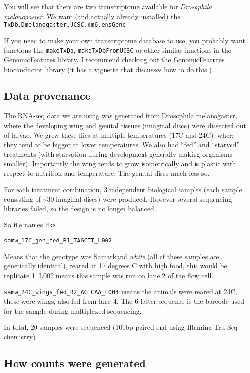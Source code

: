 \documentclass[
]{article}
\begin{document}
You will see that there are two transcriptome available for
\emph{Drosophila melanogaster}. We want (and actually already installed)
the \texttt{TxDb.Dmelanogaster.UCSC.dm6.ensGene}

If you need to make your own transcriptome database to use, you probably
want functions like \texttt{makeTxDb}, \texttt{makeTxDbFromUCSC} or
other similar functions in the GenomicFeatures library. I recommend
checking out the
\href{https://bioconductor.org/packages/release/bioc/html/GenomicFeatures.html}{GenomicFeatures
bioconductor library} (it has a vignette that discusses how to do this.)

\hypertarget{data-provenance}{%
\subsection{Data provenance}\label{data-provenance}}

The RNA-seq data we are using was generated from Drosophila
melanogaster, where the developing wing and genital tissues (imaginal
discs) were dissected out of larvae. We grew these flies at multiple
temperatures (17C and 24C), where they tend to be bigger at lower
temperatures. We also had ``fed'' and ``starved'' treatments (with
starvation during development generally making organisms smaller).
Importantly the wing tends to grow isometrically and is plastic with
respect to nutrition and temperature. The genital discs much less so.

For each treatment combination, 3 independent biological samples (each
sample consisting of \textasciitilde30 imaginal discs) were produced.
However several sequencing libraries failed, so the design is no longer
balanced.

So file names like

\texttt{samw\_17C\_gen\_fed\_R1\_TAGCTT\_L002}

Means that the genotype was Samarkand \emph{white} (all of these samples
are genetically identical), reared at 17 degrees C with high food, this
would be replicate 1. L002 means this sample was run on lane 2 of the
flow cell.

\texttt{samw\_24C\_wings\_fed\_R2\_AGTCAA\_L004} means the animals were
reared at 24C, these were wings, also fed from lane 4. The 6 letter
sequence is the barcode used for the sample during multiplexed
sequencing.

In total, 20 samples were sequenced (100bp paired end using Illumina
Tru-Seq chemistry)

\hypertarget{how-counts-were-generated}{%
\subsection{How counts were generated}\label{how-counts-were-generated}}
\end{document}
